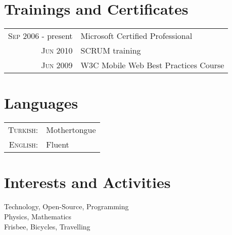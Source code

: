 \documentclass[a4paper,10pt]{article}
\begin{document}
\section{Trainings and Certificates}
\begin{tabular}{rl}
 \textsc{Sep} 2006 - present & Microsoft Certified Professional               \\
 \textsc{Jun} 2010           & \textsc{SCRUM} training                       \\
 \textsc{Jun} 2009           & \textsc{W3C} Mobile Web Best Practices Course \\
\end{tabular}

\section{Languages}
\begin{tabular}{rl}
  \textsc{Turkish:} & Mothertongue \\
  \textsc{English:} & Fluent       \\
\end{tabular}

\section{Interests and Activities}
Technology, Open-Source, Programming \\
Physics, Mathematics \\
Frisbee, Bicycles, Travelling \\
\end{document}
